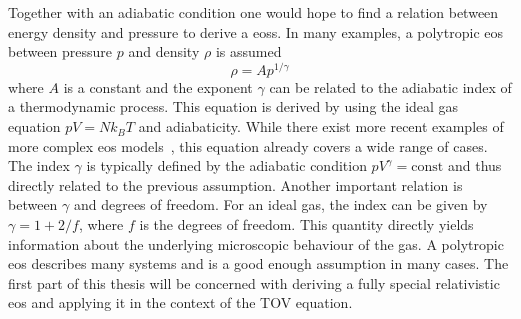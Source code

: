 Together with an adiabatic condition one would hope to find a relation between energy density and pressure to derive a \acp{eos}.
In many examples, a polytropic \ac{eos} between pressure $p$ and density $\rho$ is assumed
\begin{equation}
	\rho = Ap^{1/\gamma}
	\label{eq:01-Intr-Poly-EOS}
\end{equation}
where $A$ is a constant and the exponent $\gamma$ can be related to the adiabatic index of a thermodynamic process.
This equation is derived by using the ideal gas equation $pV=Nk_B T$ and adiabaticity.
While there exist more recent examples of more complex \ac{eos} models~\cite{hummerEquationStateStellar1988}, this equation already covers a wide range of cases.
The index $\gamma$ is typically defined by the adiabatic condition $pV^\gamma=\text{const}$ and thus directly related to the previous assumption.
Another important relation is between $\gamma$ and degrees of freedom.
For an ideal gas, the index can be given by $\gamma=1+2/f$, where $f$ is the degrees of freedom.
This quantity directly yields information about the underlying microscopic behaviour of the gas.
A polytropic \ac{eos} describes many systems and is a good enough assumption in many cases.
The first part of this thesis will be concerned with deriving a fully special relativistic \ac{eos} and applying it in the context of the \ac{TOV} equation.
